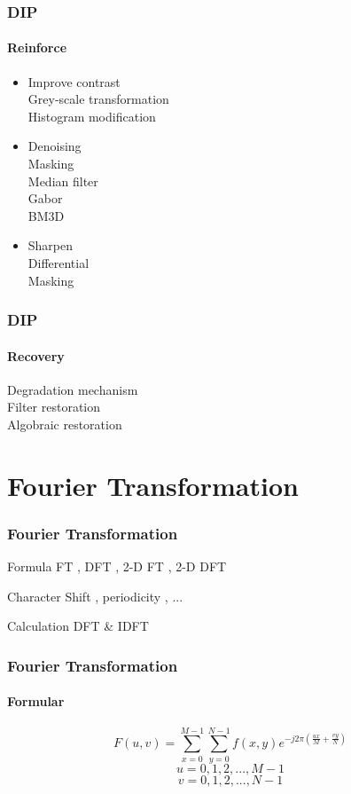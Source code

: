 \documentclass[11 pt,t]{beamer}
\begin{document}
\begin{frame}
\frametitle{DIP}
\framesubtitle{Reinforce}
\begin{itemize}
    \item Improve contrast\\
 {\textcolor{tangocolordarkchameleon}{Grey-scale transformation\\} }
 {\textcolor{tangocolordarkscarletred}{Histogram modification}}
    \item Denoising\\
 {\textcolor{tangocolordarkchameleon}{Masking\\Median filter} }\\
 {\textcolor{tangocolordarkscarletred}{Gabor\\BM3D}}
    \item Sharpen\\
 {\textcolor{tangocolordarkchameleon}{Differential\\Masking} }
\end{itemize}
\end{frame}

\begin{frame}
\frametitle{DIP}
\framesubtitle{Recovery}
Degradation mechanism\\
Filter restoration\\
Algobraic restoration
\end{frame}


\section{Fourier Transformation}
\begin{frame}
\frametitle{Fourier Transformation}
\subtitle{structure}
\begin{block}{Formula}
    FT , DFT , 2-D FT , 2-D DFT
\end{block}
\begin{exampleblock}{Character}
    Shift , periodicity , ...
\end{exampleblock}
\begin{alertblock}{Calculation}
    DFT \& IDFT
\end{alertblock}
\end{frame}

\begin{frame}
\frametitle{Fourier Transformation}
\framesubtitle{Formular}
    $$	F(u,v)=\sum\limits_{x=0}^{M-1}\sum\limits_{y=0}^{N-1}f(x,y)e^{-j2\pi(\frac{ux}{M}+\frac{vy}{N})}$$
   $$u=0,1,2,...,M-1$$$$v=0,1,2,...,N-1$$
\end{frame}
\end{document}
